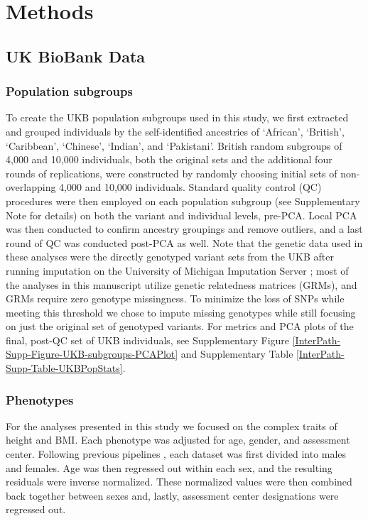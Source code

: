 \documentclass[12pt,a4paper]{article}
\begin{document}
\section{Methods}\label{InterPath-Online-Methods}

\subsection{UK BioBank Data}

\subsubsection{Population subgroups}

To create the UKB population subgroups used in this study, we first extracted and grouped individuals by the self-identified ancestries of `African', `British', `Caribbean', `Chinese', `Indian', and `Pakistani'. British random subgroups of 4,000 and 10,000 individuals, both the original sets and the additional four rounds of replications, were constructed by randomly choosing initial sets of non-overlapping 4,000 and 10,000 individuals. Standard quality control (QC) procedures were then employed on each population subgroup (see Supplementary Note for details) on both the variant and individual levels, pre-PCA. Local PCA was then conducted to confirm ancestry groupings and remove outliers, and a last round of QC was conducted post-PCA as well. Note that the genetic data used in these analyses were the directly genotyped variant sets  from the UKB after running imputation on the University of Michigan Imputation Server \citep{Das2016}; most of the analyses in this manuscript utilize genetic relatedness matrices (GRMs), and GRMs require zero genotype missingness. To minimize the loss of SNPs while meeting this threshold we chose to impute missing genotypes while still focusing on just the original set of genotyped variants. For metrics and PCA plots of the final, post-QC set of UKB individuals, see Supplementary Figure \ref{InterPath-Supp-Figure-UKB-subgroups-PCAPlot} and Supplementary Table \ref{InterPath-Supp-Table-UKBPopStats}. 

\subsubsection{Phenotypes}

For the analyses presented in this study we focused on the complex traits of height and BMI. Each phenotype was adjusted for age, gender, and assessment center. Following previous pipelines \citep{Wood2014,Locke2015}, each dataset was first divided into males and females. Age was then regressed out within each sex, and the resulting residuals were inverse normalized. These normalized values were then combined back together between sexes and, lastly, assessment center designations were regressed out. 
\end{document}
